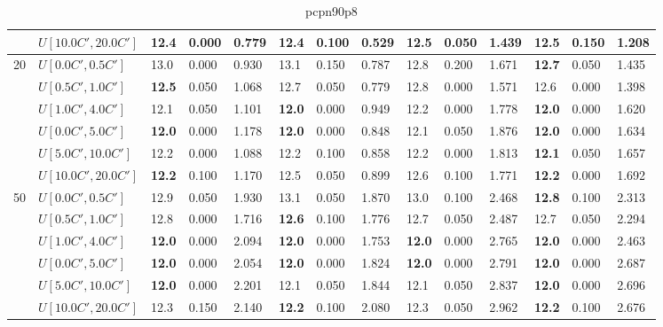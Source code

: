 \begin{table}[h]
{\begin{tabular}{|l|l||l|l|l||l|l|l||l|l|l||l|l|l|}
       & $U[10.0C',20.0C']$ & \textbf{12.4} & 0.000 & 0.779 & \textbf{12.4} & 0.100 & 0.529 & 12.5 & 0.050 & 1.439 & 12.5 & 0.150 & 1.208 \\
      \hline\hline
      \multirow{6}{*}{20} & $U[0.0C',0.5C']$ & 13.0 & 0.000 & 0.930 & 13.1 & 0.150 & 0.787 & 12.8 & 0.200 & 1.671 & \textbf{12.7} & 0.050 & 1.435 \\
       & $U[0.5C',1.0C']$ & \textbf{12.5} & 0.050 & 1.068 & 12.7 & 0.050 & 0.779 & 12.8 & 0.000 & 1.571 & 12.6 & 0.000 & 1.398 \\
       & $U[1.0C',4.0C']$ & 12.1 & 0.050 & 1.101 & \textbf{12.0} & 0.000 & 0.949 & 12.2 & 0.000 & 1.778 & \textbf{12.0} & 0.000 & 1.620 \\
       & $U[0.0C',5.0C']$ & \textbf{12.0} & 0.000 & 1.178 & \textbf{12.0} & 0.000 & 0.848 & 12.1 & 0.050 & 1.876 & \textbf{12.0} & 0.000 & 1.634 \\
       & $U[5.0C',10.0C']$ & 12.2 & 0.000 & 1.088 & 12.2 & 0.100 & 0.858 & 12.2 & 0.000 & 1.813 & \textbf{12.1} & 0.050 & 1.657 \\
       & $U[10.0C',20.0C']$ & \textbf{12.2} & 0.100 & 1.170 & 12.5 & 0.050 & 0.899 & 12.6 & 0.100 & 1.771 & \textbf{12.2} & 0.000 & 1.692 \\
      \hline\hline
      \multirow{6}{*}{50} & $U[0.0C',0.5C']$ & 12.9 & 0.050 & 1.930 & 13.1 & 0.050 & 1.870 & 13.0 & 0.100 & 2.468 & \textbf{12.8} & 0.100 & 2.313 \\
       & $U[0.5C',1.0C']$ & 12.8 & 0.000 & 1.716 & \textbf{12.6} & 0.100 & 1.776 & 12.7 & 0.050 & 2.487 & 12.7 & 0.050 & 2.294 \\
       & $U[1.0C',4.0C']$ & \textbf{12.0} & 0.000 & 2.094 & \textbf{12.0} & 0.000 & 1.753 & \textbf{12.0} & 0.000 & 2.765 & \textbf{12.0} & 0.000 & 2.463 \\
       & $U[0.0C',5.0C']$ & \textbf{12.0} & 0.000 & 2.054 & \textbf{12.0} & 0.000 & 1.824 & \textbf{12.0} & 0.000 & 2.791 & \textbf{12.0} & 0.000 & 2.687 \\
       & $U[5.0C',10.0C']$ & \textbf{12.0} & 0.000 & 2.201 & 12.1 & 0.050 & 1.844 & 12.1 & 0.050 & 2.837 & \textbf{12.0} & 0.000 & 2.696 \\
       & $U[10.0C',20.0C']$ & 12.3 & 0.150 & 2.140 & \textbf{12.2} & 0.100 & 2.080 & 12.3 & 0.050 & 2.962 & \textbf{12.2} & 0.100 & 2.676 \\
      \hline
      \end{tabular}
      }
      \caption{pcpn90p8}
      \label{tab:pcpn90p8ILPVariant}\end{table}
      
